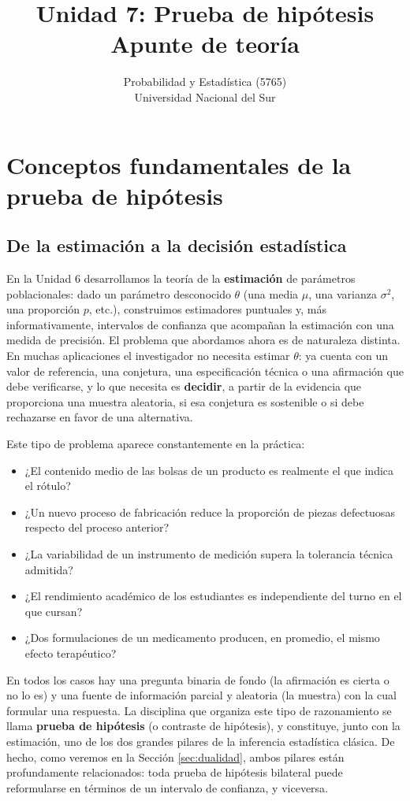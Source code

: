 \documentclass[11pt,a4paper]{article}
\title{Unidad 7: Prueba de hipótesis \\ \large Apunte de teoría}
\author{Probabilidad y Estadística (5765) \\ Universidad Nacional del Sur}
\date{}
\theoremstyle{plain}
\theoremstyle{definition}
\theoremstyle{remark}
\begin{document}
\maketitle
\tableofcontents
\newpage

\section{Conceptos fundamentales de la prueba de hipótesis}

\subsection{De la estimación a la decisión estadística}

En la Unidad 6 desarrollamos la teoría de la \textbf{estimación} de parámetros poblacionales: dado un parámetro desconocido $\theta$ (una media $\mu$, una varianza $\sigma^2$, una proporción $p$, etc.), construimos estimadores puntuales y, más informativamente, intervalos de confianza que acompañan la estimación con una medida de precisión. El problema que abordamos ahora es de naturaleza distinta. En muchas aplicaciones el investigador no necesita estimar $\theta$: ya cuenta con un valor de referencia, una conjetura, una especificación técnica o una afirmación que debe verificarse, y lo que necesita es \textbf{decidir}, a partir de la evidencia que proporciona una muestra aleatoria, si esa conjetura es sostenible o si debe rechazarse en favor de una alternativa.

Este tipo de problema aparece constantemente en la práctica:
\begin{itemize}[nosep]
\item ¿El contenido medio de las bolsas de un producto es realmente el que indica el rótulo?
\item ¿Un nuevo proceso de fabricación reduce la proporción de piezas defectuosas respecto del proceso anterior?
\item ¿La variabilidad de un instrumento de medición supera la tolerancia técnica admitida?
\item ¿El rendimiento académico de los estudiantes es independiente del turno en el que cursan?
\item ¿Dos formulaciones de un medicamento producen, en promedio, el mismo efecto terapéutico?
\end{itemize}

En todos los casos hay una pregunta binaria de fondo (la afirmación es cierta o no lo es) y una fuente de información parcial y aleatoria (la muestra) con la cual formular una respuesta. La disciplina que organiza este tipo de razonamiento se llama \textbf{prueba de hipótesis} (o contraste de hipótesis), y constituye, junto con la estimación, uno de los dos grandes pilares de la inferencia estadística clásica. De hecho, como veremos en la Sección \ref{sec:dualidad}, ambos pilares están profundamente relacionados: toda prueba de hipótesis bilateral puede reformularse en términos de un intervalo de confianza, y viceversa.
\end{document}

